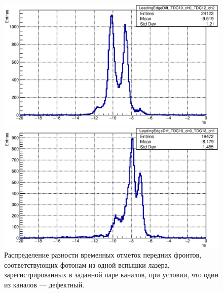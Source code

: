 \begin{figure}
\begin{minipage}[b]{0.495\textwidth}
\includegraphics[width=1.0\textwidth]{pictures/23_LeadingEdgeDiff_TDC10_ch0_TDC12_ch2.eps}
\end{minipage}
\hspace{0.01\textwidth}
\begin{minipage}[b]{0.495\textwidth}
\includegraphics[width=1.0\textwidth]{pictures/23_LeadingEdgeDiff_TDC10_ch0_TDC13_ch1.eps}
\end{minipage}
\caption{Распределение разности временных отметок передних фронтов, соответствующих фотонам из одной вспышки лазера, зарегистрированных в заданной паре каналов, при условии, что один из каналов --- дефектный.}
\label{fig:LeadingEdgeDiffMultiplePeaks}
\end{figure}

